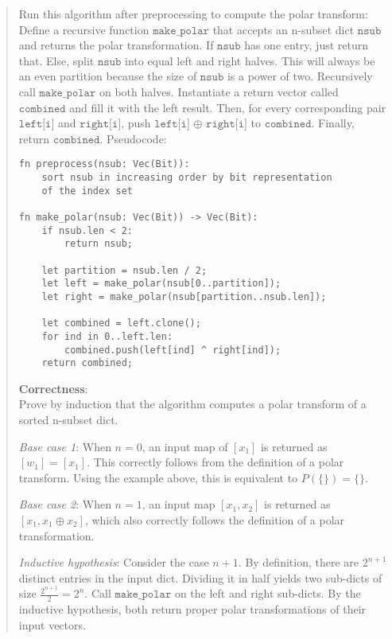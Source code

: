 \documentclass[11pt]{article}
\newcommand{\code}[1]{$\texttt{#1}$}
\begin{document}
\begin{enumerate}
\begin{enumerate}
\begin{quote}
    \medskip
  Run this algorithm after preprocessing to compute the polar transform: Define a recursive function \code{make\_polar} that accepts an n-subset dict \code{nsub} and returns the polar transformation. If \code{nsub} has one entry, just return that. Else, split \code{nsub} into equal left and right halves. This will always be an even partition because the size of \code{nsub} is a power of two. Recursively call \code{make\_polar} on both halves. Instantiate a return vector called \code{combined} and fill it with the left result. Then, for every corresponding pair \code{left[i]} and \code{right[i]}, push \code{left[i]} $\oplus$ \code{right[i]} to \code{combined}. Finally, return \code{combined}. Pseudocode:

    \medskip
    \begin{verbatim}
fn preprocess(nsub: Vec(Bit)):
    sort nsub in increasing order by bit representation
    of the index set

fn make_polar(nsub: Vec(Bit)) -> Vec(Bit):
    if nsub.len < 2:
        return nsub;

    let partition = nsub.len / 2;
    let left = make_polar(nsub[0..partition]);
    let right = make_polar(nsub[partition..nsub.len]);
    
    let combined = left.clone();
    for ind in 0..left.len:
        combined.push(left[ind] ^ right[ind]);
    return combined;
    \end{verbatim}

    \medskip
    \textbf{Correctness}: \\ 
    Prove by induction that the algorithm computes a polar transform of a sorted n-subset dict.

    \medskip
    \textit{Base case 1}: When $n = 0$, an input map of $[x_1]$ is returned as $[w_1] = [x_1]$. This correctly follows from the definition of a polar transform. Using the example above, this is equivalent to $P(\{\}) = \{\}$.

    \medskip
    \textit{Base case 2}: When $n = 1$, an input map $[x_1, x_2]$ is returned as $[x_1, x_1 \oplus x_2]$, which also correctly follows the definition of a polar transformation.

    \medskip
    \textit{Inductive hypothesis}: Consider the case $n + 1$. By definition, there are $2^{n + 1}$ distinct entries in the input dict. Dividing it in half yields two sub-dicts of size $\frac{2^{n + 1}}{2} = 2^n$. Call \code{make\_polar} on the left and right sub-dicts. By the inductive hypothesis, both return proper polar transformations of their input vectors. 


\end{quote}
\end{enumerate}
\end{enumerate}
\end{document}
